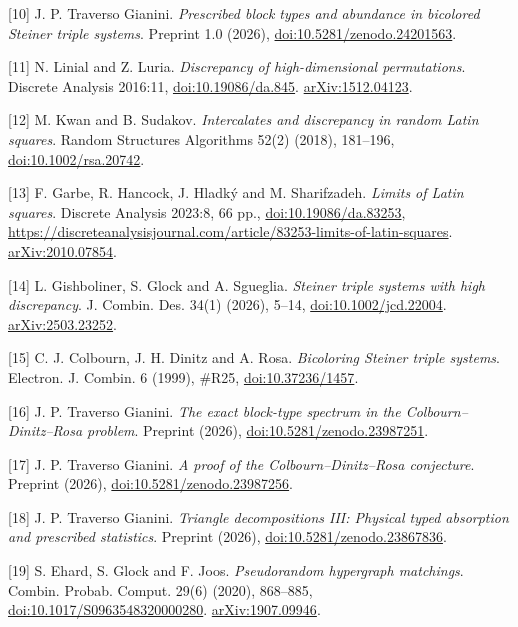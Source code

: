 \documentclass[spanish,11pt,a4paper]{article}
\begin{document}
{[}10{]} J. P. Traverso Gianini. \emph{Prescribed block types and abundance in bicolored Steiner triple systems}. Preprint 1.0 (2026), \href{https://doi.org/10.5281/zenodo.24201563}{doi:10.5281/zenodo.24201563}.

{[}11{]} N. Linial and Z. Luria. \emph{Discrepancy of high-dimensional permutations}. Discrete Analysis 2016:11, \href{https://doi.org/10.19086/da.845}{doi:10.19086/da.845}. \href{https://arxiv.org/abs/1512.04123}{arXiv:1512.04123}.

{[}12{]} M. Kwan and B. Sudakov. \emph{Intercalates and discrepancy in random Latin squares}. Random Structures Algorithms 52(2) (2018), 181--196, \href{https://doi.org/10.1002/rsa.20742}{doi:10.1002/rsa.20742}.

{[}13{]} F. Garbe, R. Hancock, J. Hladký and M. Sharifzadeh. \emph{Limits of Latin squares}. Discrete Analysis 2023:8, 66 pp., \href{https://doi.org/10.19086/da.83253}{doi:10.19086/da.83253}, \url{https://discreteanalysisjournal.com/article/83253-limits-of-latin-squares}. \href{https://arxiv.org/abs/2010.07854}{arXiv:2010.07854}.

{[}14{]} L. Gishboliner, S. Glock and A. Sgueglia. \emph{Steiner triple systems with high discrepancy}. J. Combin. Des. 34(1) (2026), 5--14, \href{https://doi.org/10.1002/jcd.22004}{doi:10.1002/jcd.22004}. \href{https://arxiv.org/abs/2503.23252}{arXiv:2503.23252}.

{[}15{]} C. J. Colbourn, J. H. Dinitz and A. Rosa. \emph{Bicoloring Steiner triple systems}. Electron. J. Combin. 6 (1999), \#R25, \href{https://doi.org/10.37236/1457}{doi:10.37236/1457}.

{[}16{]} J. P. Traverso Gianini. \emph{The exact block-type spectrum in the Colbourn--Dinitz--Rosa problem}. Preprint (2026), \href{https://doi.org/10.5281/zenodo.23987251}{doi:10.5281/zenodo.23987251}.

{[}17{]} J. P. Traverso Gianini. \emph{A proof of the Colbourn--Dinitz--Rosa conjecture}. Preprint (2026), \href{https://doi.org/10.5281/zenodo.23987256}{doi:10.5281/zenodo.23987256}.

{[}18{]} J. P. Traverso Gianini. \emph{Triangle decompositions III: Physical typed absorption and prescribed statistics}. Preprint (2026), \href{https://doi.org/10.5281/zenodo.23867836}{doi:10.5281/zenodo.23867836}.

{[}19{]} S. Ehard, S. Glock and F. Joos. \emph{Pseudorandom hypergraph matchings}. Combin. Probab. Comput. 29(6) (2020), 868--885, \href{https://doi.org/10.1017/S0963548320000280}{doi:10.1017/S0963548320000280}. \href{https://arxiv.org/abs/1907.09946}{arXiv:1907.09946}.
\end{document}

